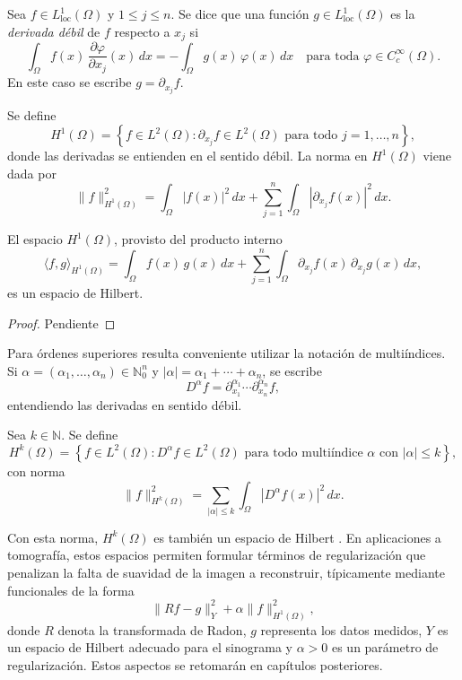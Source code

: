 \begin{definition}
Sea $f \in L^{1}_{\mathrm{loc}}(\Omega)$ y $1 \le j \le n$. Se dice que una función $g \in L^{1}_{\mathrm{loc}}(\Omega)$ es la \emph{derivada débil} de $f$ respecto a $x_{j}$ si
\[
\int_{\Omega} f(x)\, \frac{\partial \varphi}{\partial x_{j}}(x)\, dx
= - \int_{\Omega} g(x)\, \varphi(x)\, dx
\quad \text{para toda } \varphi \in C_{c}^{\infty}(\Omega).
\]
En este caso se escribe $g = \partial_{x_{j}} f$.
\end{definition}

\begin{definition}
Se define
\[
H^{1}(\Omega) = \left\{ f \in L^{2}(\Omega) : \partial_{x_{j}} f \in L^{2}(\Omega) \text{ para todo } j=1,\dots,n \right\},
\]
donde las derivadas se entienden en el sentido débil. La norma en $H^{1}(\Omega)$ viene dada por
\[
\|f\|_{H^{1}(\Omega)}^{2} 
= \int_{\Omega} |f(x)|^{2}\,dx 
+ \sum_{j=1}^{n} \int_{\Omega} \left|\partial_{x_{j}} f(x)\right|^{2}\,dx.
\]
\end{definition}

\begin{proposition}
El espacio $H^{1}(\Omega)$, provisto del producto interno
\[
\langle f,g \rangle_{H^{1}(\Omega)}
= \int_{\Omega} f(x)\,g(x)\,dx
+ \sum_{j=1}^{n} \int_{\Omega} \partial_{x_{j}} f(x)\,\partial_{x_{j}} g(x)\,dx,
\]
es un espacio de Hilbert.
\end{proposition}

\begin{proof}
Pendiente
\end{proof}

Para órdenes superiores resulta conveniente utilizar la notación de multiíndices. Si $\alpha = (\alpha_{1},\dots,\alpha_{n}) \in \mathbb{N}_{0}^{n}$ y $|\alpha| = \alpha_{1} + \cdots + \alpha_{n}$, se escribe
\[
D^{\alpha} f = \partial_{x_{1}}^{\alpha_{1}} \cdots \partial_{x_{n}}^{\alpha_{n}} f,
\]
entendiendo las derivadas en sentido débil.

\begin{definition}
Sea $k \in \mathbb{N}$. Se define
\[
H^{k}(\Omega) = \left\{ f \in L^{2}(\Omega) : D^{\alpha} f \in L^{2}(\Omega) \text{ para todo multiíndice } \alpha \text{ con } |\alpha|\le k \right\},
\]
con norma
\[
\|f\|_{H^{k}(\Omega)}^{2}
= \sum_{|\alpha|\le k} \int_{\Omega} |D^{\alpha} f(x)|^{2}\,dx.
\]
\end{definition}

Con esta norma, $H^{k}(\Omega)$ es también un espacio de Hilbert \cite{kirsch2011}. En aplicaciones a tomografía, estos espacios permiten formular términos de regularización que penalizan la falta de suavidad de la imagen a reconstruir, típicamente mediante funcionales de la forma
\[
\|Rf - g\|_{Y}^{2} + \alpha \|f\|_{H^{1}(\Omega)}^{2},
\]
donde $R$ denota la transformada de Radon, $g$ representa los datos medidos, $Y$ es un espacio de Hilbert adecuado para el sinograma y $\alpha>0$ es un parámetro de regularización. Estos aspectos se retomarán en capítulos posteriores.


